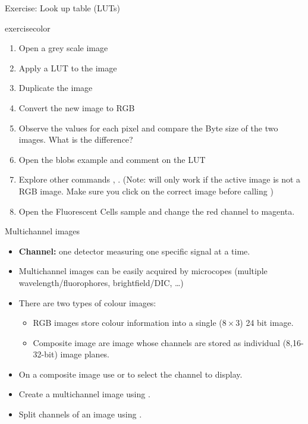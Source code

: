 \documentclass[ignorenonframetext,aspectratio=169,10pt,xcolor=table]{beamer}
\begin{document}
\begin{frame}{Exercise: Look up table (LUTs)}
  \begin{beamercolorbox}[rounded=true, shadow=true, wd=\textwidth, sep=-1em]{exercisecolor}%
    \begin{enumerate}
      \item Open a grey scale image 
      \item Apply a LUT to the image 
      \item Duplicate the image 
      \item Convert the new image to RGB 
      \item Observe the values for each pixel and compare the Byte size of the two images. What is the difference?
      \item Open the blobs example  and
            comment on the LUT
      \item Explore other commands ,
            . (Note:  will only work if the active image  is not a RGB image. Make sure you click on the correct image before calling )
      \item Open the Fluorescent Cells sample and change the red channel
            to magenta.
    \end{enumerate}
  \end{beamercolorbox}
\end{frame}


\begin{frame}{Multichannel images}

  \begin{itemize} \setlength\itemsep{1em}
    \item \textbf{Channel:} one detector measuring one specific signal at a time.
    \item Multichannel images can be easily acquired by microcopes
          (multiple wavelength/fluorophores, brightfield/DIC, \dots)
    \item There are two types of colour images:
          \begin{itemize}
            \item RGB images store colour information into a single ($8 \times
                    3$) 24 bit image.
            \item Composite image are image whose channels are stored as
                  individual (8,16-32-bit) image planes.
          \end{itemize}
    \item On a composite image use  or
           to select the channel to display.
    \item Create a multichannel image using .
    \item Split channels of an image using .
  \end{itemize}

\end{frame}
\end{document}
